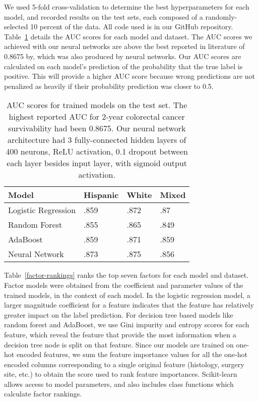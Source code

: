 \documentclass[review]{elsarticle}
\begin{document}
We used 5-fold cross-validation to determine the best hyperparameters for each model, and recorded results on the test sets, each composed of a randomly-selected 10 percent of the data. All code used is in our GitHub repository\cite{cancer_survivability}. Table~\ref{auc-scores} details the AUC scores for each model and dataset. The AUC scores we achieved with our neural networks are above the best reported in literature of 0.8675 by\cite{al2017survivability}, which was also produced by neural networks. Our AUC scores are calculated on each model's prediction of the probability that the true label is positive. This will provide a higher AUC score because wrong predictions are not penalized as heavily if their probability prediction was closer to 0.5.
\begin{table}[H]
	\centering
	\begin{tabular}{llll}
		\textbf{Model}      & \textbf{Hispanic} & \textbf{White} & \textbf{Mixed}  \\ 
		\hline
		Logistic Regression & .859              & .872           & .87             \\
		Random Forest       & .855              & .865           & .849            \\
		AdaBoost            & .859              & .871           & .859            \\
		Neural Network       & .873              & .875           & .856           
	\end{tabular}
	\caption{AUC scores for trained models on the test set. The highest reported AUC for 2-year colorectal cancer survivability had been 0.8675\cite{al2017survivability}. Our neural network architecture had 3 fully-connected hidden layers of 400 neurons, ReLU activation, 0.1 dropout between each layer besides input layer, with sigmoid output activation.}
	\label{auc-scores}
\end{table}

Table~\ref{factor-rankings} ranks the top seven factors for each model and dataset. Factor models were obtained from the coefficient and parameter values of the trained models, in the context of each model. In the logistic regression model, a larger magnitude coefficient for a feature indicates that the feature has relatively greater impact on the label prediction. For decision tree based models like random forest and AdaBoost, we use Gini impurity and entropy scores for each feature, which reveal the feature that provide the most information when a decision tree node is split on that feature. Since our models are trained on one-hot encoded features, we sum the feature importance values for all the one-hot encoded columns corresponding to a single original feature (histology, surgery site, etc.) to obtain the score used to rank feature importances. Scikit-learn allows access to model parameters, and also includes class functions which calculate factor rankings.
\end{document}
